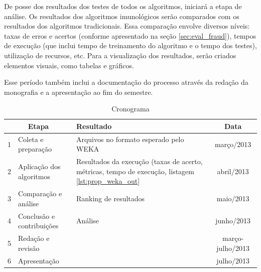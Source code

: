 De posse dos resultados dos testes de todos os algoritmos, iniciará a etapa de análise. Os resultados dos algoritmos imunológicos serão comparados com os resultados dos algoritmos tradicionais. Essa comparação envolve diversos níveis: taxas de erros e acertos (conforme apresentado na seção \ref{sec:eval_fraud}), tempos de execução (que inclui tempo de treinamento do algoritmo e o tempo dos testes), utilização de recursos, etc. Para a visualização dos resultados, serão criados elementos visuais, como tabelas e gráficos.

Esse período também inclui a documentação do processo através da redação da monografia e a apresentação ao fim do semestre.

\vspace{0.5cm}
\begin{table}[h]
    \centering
    \caption{Cronograma}
    \label{tab:prop_cron}
    \vspace{0.5cm}
    \begin{tabular}{l >{\arraybackslash}m{5cm} >{\centering\arraybackslash}m{6cm} c}
        \multicolumn{2}{c}{Etapa} & Resultado & Data \\
        \hline
        1 & Coleta e preparação                 & Arquivos no formato esperado pelo WEKA & março/2013 \\
        2 & Aplicação dos algoritmos            & Resultados da execução (taxas de acerto, métricas, tempo de execução, listagem \ref{lst:prop_weka_out} & abril/2013 \\
        3 & Comparação e análise                & Ranking de resultados & maio/2013 \\
        4 & Conclusão e contribuições           & Análise & junho/2013 \\
        5 & Redação e revisão                   & & março-julho/2013 \\
        6 & Apresentação                        & & julho/2013 \\
    \end{tabular}
\end{table}
\vspace{0.5cm}

\fi
